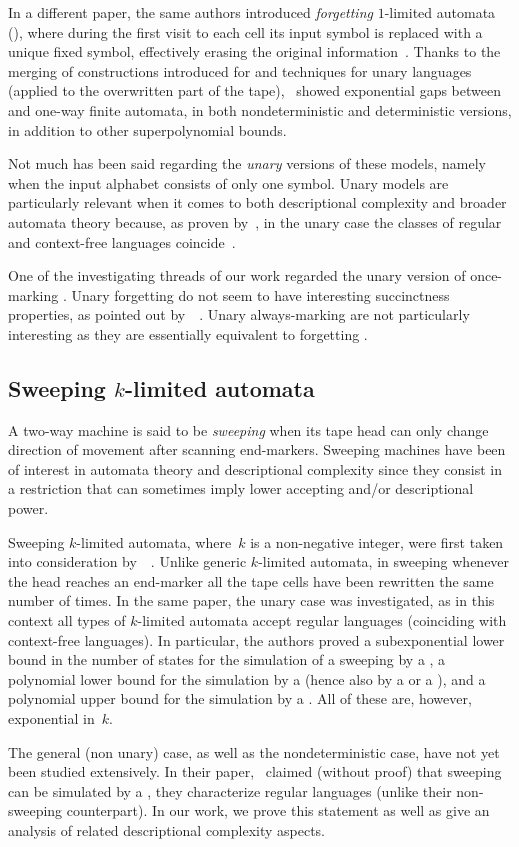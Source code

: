 In a different paper, the same authors introduced \emph{forgetting} $1$-limited automata (\FOLA), where during the first visit to each cell its input symbol is replaced with a unique fixed symbol, effectively erasing the original information~\cite{PigPri23,JanMra+93}.
Thanks to the merging of constructions introduced for \AMOLA and techniques for unary languages (applied to the overwritten part of the tape),~\citeauthor{PigPri23} showed exponential gaps between \AMOLA and one-way finite automata, in both nondeterministic and deterministic versions, in addition to other superpolynomial bounds.

Not much has been said regarding the \emph{unary} versions of these models, namely when the input alphabet consists of only one symbol.
Unary models are particularly relevant when it comes to both descriptional complexity and broader automata theory because, as proven by~\citeauthor{GinRic62}, in the unary case the classes of regular and context-free languages coincide~\cite{GinRic62}.

One of the investigating threads of our work regarded the unary version of once-marking \OLAs.
Unary forgetting \OLAs do not seem to have interesting succinctness properties, as pointed out by~\citeauthor{PigPri23}~\cite{PigPri23}.
Unary always-marking \OLAs are not particularly interesting as they are essentially equivalent to forgetting \OLA.


\subsection{Sweeping \texorpdfstring{$k$}{k}-limited automata}
A two-way machine is said to be \emph{sweeping} when its tape head can only change direction of movement after scanning end-markers.
Sweeping machines have been of interest in automata theory and descriptional complexity since they consist in a restriction that can sometimes imply lower accepting and/or descriptional power.

Sweeping $k$-limited automata, where~$k$ is a non-negative integer, were first taken into consideration by~\citeauthor{KutPig+18}~\cite{KutPig+18}.
Unlike generic $k$-limited automata, in sweeping \kLA whenever the head reaches an end-marker all the tape cells have been rewritten the same number of times.
In the same paper, the unary case was investigated, as in this context all types of $k$-limited automata accept regular languages (coinciding with context-free languages).
In particular, the authors proved a subexponential lower bound in the number of states for the simulation of a sweeping \kDLA by a \ODFA, a polynomial lower bound for the simulation by a \TNFA (hence also by a \TDFA or a \ONFA), and a polynomial upper bound for the simulation by a \TDFA.
All of these are, however, exponential in~$k$.

The general (non unary) case, as well as the nondeterministic case, have not yet been studied extensively.
In their paper,~\citeauthor{KutPig+18} claimed (without proof) that sweeping \kLAs can be simulated by a \ONFA, \ie they characterize regular languages (unlike their non-sweeping counterpart).
In our work, we prove this statement as well as give an analysis of related descriptional complexity aspects.
